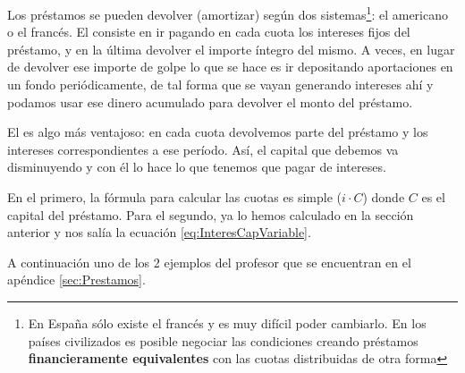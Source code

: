 \documentclass[nochap,palatino,shortheader]{apuntes}
\newcommand{\study}[1]{#1} \newcommand{\substudy}[1]{#1}
\begin{document}
Los préstamos se pueden devolver (amortizar) según dos sistemas\footnote{\study{En España sólo existe el francés} y es muy difícil poder cambiarlo. En los países civilizados es posible negociar las condiciones creando préstamos \textbf{financieramente equivalentes} con las cuotas distribuidas de otra forma}: el americano o el francés.
El  consiste en ir \substudy{pagando en cada cuota los intereses fijos} del préstamo, y \substudy{en la última devolver el importe íntegro} del mismo.
A veces, en lugar de devolver ese importe de golpe lo que se hace es ir depositando aportaciones en un fondo periódicamente, de tal forma que se vayan generando intereses ahí y podamos usar ese dinero acumulado para devolver el monto del préstamo.

El  es algo más ventajoso: \substudy{en cada cuota devolvemos parte del préstamo y los intereses correspondientes a ese período}. Así, el capital que debemos va disminuyendo y con él lo hace lo que tenemos que pagar de intereses.

En el primero, la fórmula para calcular las cuotas es simple ($i·C$) donde $C$ es el capital del préstamo. Para el segundo, ya lo hemos calculado en la sección anterior y nos salía la ecuación \eqref{eq:InteresCapVariable}.


A continuación uno de los 2 ejemplos del profesor que se encuentran en el apéndice \ref{sec:Prestamos}.
\end{document}
